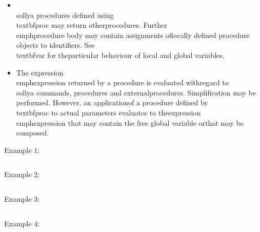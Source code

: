 \begin{itemize}
\item \\sollya procedures defined using \\textbf{proc} may return other\n   procedures. Further \\emph{procedure body} may contain assignments of\n   locally defined procedure objects to identifiers. See \\textbf{var} for the\n   particular behaviour of local and global variables.\n
\item The expression \\emph{expression} returned by a procedure is evaluated with\n   regard to \\sollya commands, procedures and external\n   procedures. Simplification may be performed.  However, an application\n   of a procedure defined by \\textbf{proc} to actual parameters evaluates to the\n   expression \\emph{expression} that may contain the free global variable or\n   that may be composed.\n\end{itemize}
\noindent Example 1: 
\begin{center}\begin{minipage}{15cm}\begin{Verbatim}[frame=single]
\end{Verbatim}
\end{minipage}\end{center}
\noindent Example 2: 
\begin{center}\begin{minipage}{15cm}\begin{Verbatim}[frame=single]
\end{Verbatim}
\end{minipage}\end{center}
\noindent Example 3: 
\begin{center}\begin{minipage}{15cm}\begin{Verbatim}[frame=single]
\end{Verbatim}
\end{minipage}\end{center}
\noindent Example 4: 
\begin{center}\begin{minipage}{15cm}\begin{Verbatim}[frame=single]
\end{Verbatim}
\end{minipage}\end{center}
